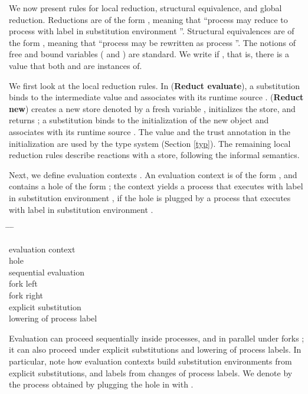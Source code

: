 \documentclass{sigplanconf}
\newenvironment{defn2}{\begin{tabbing}
  \hspace{1.5em} \= \hspace{.295\linewidth - 1.5em} \= \hspace{1.5em} \= \kill
  }{
  \end{tabbing}}
\newcommand{\entry}[2]{\>\>\>#2}
\newcommand{\clause}[2]{\>\>#2}
\newcommand{\mycategory}[2]{\clause{#1::=}{#2}}
\newcommand{\labp}{\mathsf P}
\newcommand{\new}[2]{(\nu #1)\:#2}
\newcommand{\fork}[2]{#1\Rsh\:\!#2}
\newcommand{\eval}[3]{\mathsf{let}~#1=#2~\mathsf{in}~#3}
\newcommand{\rrule}[1]{\textbf{Reduct #1}}
\begin{document}
We now present rules for local reduction, structural equivalence, and global reduction.
Reductions are of the form , meaning that ``process  
may reduce to process  with label  in
substitution environment ''. Structural equivalences are of the form , meaning that ``process  may be rewritten as process ''.
The notions
of free and bound variables ( and ) are
standard. 
We write  if , that is, there is a value that both  and  are instances of.


We first look at the local reduction rules.
In (\rrule{evaluate\-}), a substitution binds  to the intermediate value  and associates  with its
runtime source . 
(\rrule{new}) creates a new store denoted by a fresh variable , initializes the store, and returns ; a substitution binds  to the initialization of the new object and associates  with its runtime source . The value  and the trust annotation  in the initialization are used by the type system (Section \ref{typ}).
The remaining local reduction rules describe reactions with a store, following the informal semantics.

Next, we define evaluation contexts \cite{evalcontext}. An evaluation context is of the form , and contains a hole of the form ; the context yields a process that executes with label
 in substitution environment , if the hole is plugged by a process that executes with label  in substitution environment .
\begin{defn2}
\mycategory{\mathcal E_{\labp;\sigma}}{evaluation context} \\
\entry{\bullet_{\labp;\sigma}}{hole} \\
\entry{\eval x {\mathcal E_{\labp;\sigma}} b}{sequential evaluation} \\
\entry{\fork{\mathcal E_{\labp;\sigma}} b}{fork left} \\
\entry{\fork a \mathcal E_{\labp;\sigma}}{fork right} \\
\entry{\new {x/\mu @\labp'} \mathcal E_{\labp;\{x/\mu@\labp'\}\cup \sigma}}{explicit substitution} \\
\entry{[\labp']~\mathcal E_{\labp';\sigma}~~~~~(\labp' \sqsubseteq \labp)}{lowering of process label}
\end{defn2}
Evaluation can proceed sequentially inside  processes, and in parallel under forks \cite{gordon98concurrent}; it can also proceed under
explicit substitutions and lowering of process labels. 
In particular, note how evaluation contexts build substitution environments from explicit substitutions, and labels from changes of process labels. 
We denote by  the process obtained by plugging the
hole  in  with . 
\end{document}
